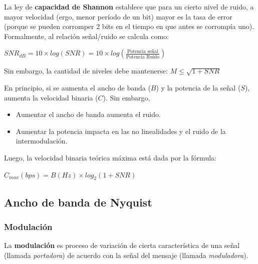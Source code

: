 \documentclass[]{article}
\begin{document}
La ley de \textbf{capacidad de Shannon} establece que para un cierto nivel de ruido, a mayor velocidad (ergo, menor período de un bit) mayor es la tasa de error (porque se pueden corromper 2 bits en el tiempo en que antes se corrompía uno). Formalmente, al relación señal/ruido se calcula como:

\begin{center}
    $SNR_{dB} = 10\times log(SNR) = 10\times log\left(\displaystyle\frac{\text{Potencia señal}}{\text{Potencia Ruido}}\right)$
\end{center}

Sin embargo, la cantidad de niveles debe mantenerse: $M \leq \displaystyle \sqrt{1+SNR}$

En principio, si se aumenta el ancho de banda ($B$) y la potencia de la señal ($S$), aumenta la velocidad binaria ($C$). Sin embargo,
\begin{itemize}
    \item Aumentar el ancho de banda aumenta el ruido.
    \item Aumentar la potencia impacta en las no linealidades y el ruido de la intermodulación.
\end{itemize}

Luego, la velocidad binaria teórica máxima está dada por la fórmula:
\begin{center}
    $C_{max}(bps) = B(Hz)\times log_2(1+SNR)$
\end{center}

\subsection{Ancho de banda de Nyquist}



\subsubsection {Modulación}
La \textbf{modulación} es proceso de variación de cierta característica de una señal (llamada \emph{portadora}) de acuerdo con la señal del mensaje (llamada \emph{moduladora}).
\end{document}
